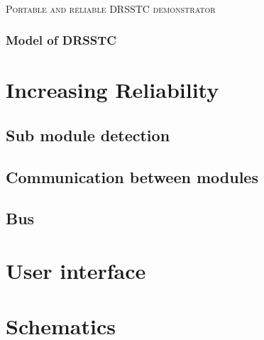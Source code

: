 \documentclass[12pt,English,a4paper,twoside,openright]{article}
\title{\MyTitle{}}
\author{\MyAuthor{}}
\newcommand{\MyTitle}{Portable and reliable DRSSTC demonstrator\\ }
\begin{document}


\newpage
\thispagestyle{empty}
\textsc{}\\
[4cm]
\begin{center}
\textsc{\Huge \MyTitle{}}
\end{center}
\restoregeometry %
\newpage

\pagestyle{fancy}
\setcounter{page}{1}
\label{abstract}

\newpage


\newpage

\tableofcontents
\listoffigures
\listoftables
\cleardoublepage %

\pagestyle{fancy}
\setcounter{page}{1}



\subsubsection{Model of DRSSTC}





\section{Increasing Reliability}
\subsection{Sub module detection}
\subsection{Communication between modules}
\subsection{Bus}
\section{User interface}
\section{Schematics}
\end{document}
